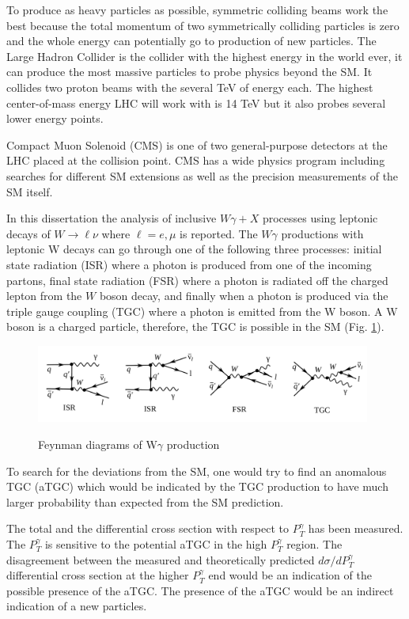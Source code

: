 To produce as heavy particles as possible, symmetric colliding beams work the best because the total momentum of two symmetrically colliding particles is zero and the whole energy can potentially go to production of new particles. The Large Hadron Collider is the collider with the highest energy in the world ever, it can produce the most massive particles to probe physics beyond the SM. It collides two proton beams with the several TeV of energy each. The highest center-of-mass energy LHC will work with is 14 TeV but it also probes several lower energy points. 

Compact Muon Solenoid (CMS) is one of two general-purpose detectors at the LHC placed at the collision point. CMS has a wide physics program including searches for different SM extensions as well as the precision measurements of the SM itself.  

In this dissertation the analysis of inclusive $W\gamma + X$  processes using  leptonic decays of $W\to \ell\nu$ where $\ell = e, \mu$ is reported. The $W\gamma$ productions with leptonic W decays can go through one of the following three processes: initial state radiation (ISR) where a photon is produced from one of the incoming partons, final state radiation (FSR) where a photon is radiated off the charged lepton from the $W$ boson decay, and finally when a photon is produced via the triple gauge coupling (TGC) where a photon is emitted from the W boson. A W boson is a charged particle, therefore, the TGC is possible in the SM (Fig. \ref{fig:feynmWg}). 

\begin{figure}[htb]
  \begin{center}
    {\includegraphics[width=0.98\textwidth]{../figs/Intro/feynmWg.png}}
    \caption{Feynman diagrams of W$\gamma$ production}
    \label{fig:feynmWg}
  \end{center}
\end{figure}

To search for the deviations from the SM, one would try to find an anomalous TGC (aTGC) which would be indicated by the TGC production to have much larger probability than expected from the SM prediction. 

The total and the differential cross section with respect to $P_T^{\gamma}$ has been measured. The $P_T^{\gamma}$ is sensitive to the potential aTGC in the high $P_T^{\gamma}$ region. The disagreement between the measured and theoretically predicted $d\sigma/dP_T^{\gamma}$ differential cross section at the higher $P_T^{\gamma}$ end would be an indication of the possible presence of the aTGC. The presence of the aTGC would be an indirect indication of a new particles.




%
%
%
%
%
%
